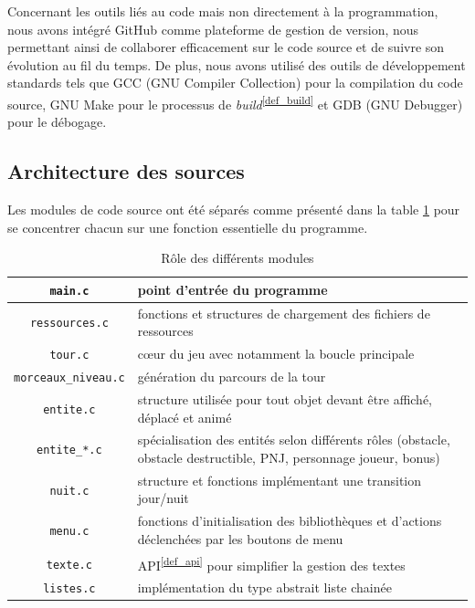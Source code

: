 \documentclass[a4paper,12pt]{article}
\newcommand\refsuscrite[1]{\textsuperscript{\ref{#1}}}
\begin{document}
Concernant les outils liés au code mais non directement à la programmation, nous avons intégré GitHub comme plateforme de gestion de version, nous permettant ainsi de collaborer efficacement sur le code source et de suivre son évolution au fil du temps.
De plus, nous avons utilisé des outils de développement standards tels que GCC (GNU Compiler Collection) pour la compilation du code source, GNU Make pour le processus de \textit{build}\refsuscrite{def_build} et GDB (GNU Debugger) pour le débogage.

\subsection{Architecture des sources}

Les modules de code source ont été séparés comme présenté dans la table \ref{table_archi} pour se concentrer chacun sur une fonction essentielle du programme.

\begin{table}[H]
    \centering
    \begin{tabular}{c p{}}
	\toprule
	\texttt{main.c}			    & point d’entrée du programme	\\
	\midrule
	\texttt{ressources.c}		    & fonctions et structures de chargement des fichiers de ressources	\\
	\midrule
	\texttt{tour.c}			    & cœur du jeu avec notamment la boucle principale	\\
	\midrule
        \texttt{morceaux\_niveau.c}	    & génération du parcours de la tour \\
	\midrule
	\texttt{entite.c}                   & structure utilisée pour tout objet devant être affiché, déplacé et animé  \\
	\midrule
        \texttt{entite\_*.c}                & spécialisation des entités selon différents rôles (obstacle, obstacle destructible, PNJ, personnage joueur, bonus)  \\
	\midrule
	\texttt{nuit.c}			    & structure et fonctions implémentant une transition jour/nuit \\
	\midrule
	\texttt{menu.c} 		    & fonctions d’initialisation des bibliothèques et d’actions déclenchées par les boutons de menu \\
	\midrule
	\texttt{texte.c}		    & API\refsuscrite{def_api} pour simplifier la gestion des textes   \\
	\midrule
	\texttt{listes.c}		    & implémentation du type abstrait liste chainée \\
	\bottomrule
    \end{tabular}
    \caption{Rôle des différents modules}
    \label{table_archi}
\end{table}
\end{document}
